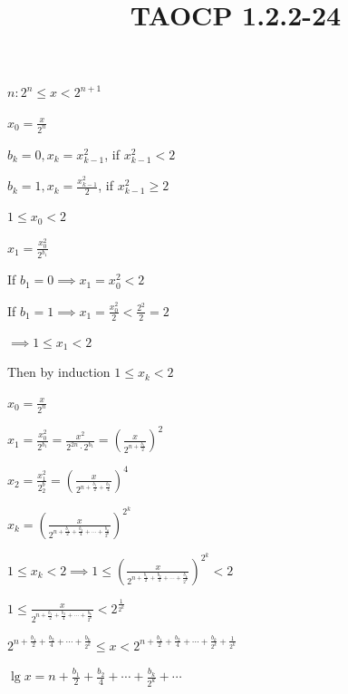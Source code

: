 \documentclass{article}
\title{TAOCP 1.2.2\mbox{-}24}
\begin{document}
\maketitle

\( n: 2^{n} \leq x < 2^{n+1} \)

\( x_{0} = \frac{x}{2^{n}} \)

\( b_{k} = 0, x_{k} = x_{k-1}^{2} \), if \( x_{k-1}^{2} < 2 \)

\( b_{k} = 1, x_{k} = \frac{x_{k-1}^{2}}{2} \), if \( x_{k-1}^{2} \geq 2 \)

\( 1 \leq x_{0} < 2 \)

\( x_{1} = \frac{x_{0}^{2}}{2^{b_{1}}} \)

If \( b_{1}=0 \implies x_{1} = x_{0}^{2} < 2 \)

If \( b_{1}=1 \implies x_{1} = \frac{x_{0}^{2}}{2} < \frac{2^{2}}{2} = 2 \)

\( \implies 1 \leq x_{1} < 2 \)

Then by induction \( 1 \leq x_{k} < 2 \)

\( x_{0} = \frac{x}{2^{n}} \)

\( x_{1} = \frac{x_{0}^{2}}{2^{b_{1}}} = \frac{x^{2}}{2^{2n}\cdot2^{b_{1}}} = {(\frac{x}{2^{n+\frac{b_{1}}{2}}})}^{2} \)

\( x_{2} = \frac{x_{1}^{2}}{2^{b}_{2}} = {(\frac{x}{2^{n+\frac{b_{1}}{2} + \frac{b_{2}}{4}}})}^{4} \)

\( x_{k} = {(\frac{x}{2^{n+\frac{b_{1}}{2} + \frac{b_{2}}{4} + \cdots + \frac{b_{k}}{2^{k}}}})}^{2^{k}} \)

\( 1 \leq x_{k} < 2 \implies 1 \leq {(\frac{x}{2^{n+\frac{b_{1}}{2} + \frac{b_{2}}{4} + \cdots + \frac{b_{k}}{2^{k}}}})}^{2^{k}} < 2 \)

\( 1 \leq \frac{x}{2^{n+\frac{b_{1}}{2} + \frac{b_{2}}{4} + \cdots + \frac{b_{k}}{2^{k}}}} < 2^{\frac{1}{2^{k}}} \)

\( 2^{n+\frac{b_{1}}{2} + \frac{b_{2}}{4} + \cdots + \frac{b_{k}}{2^{k}}} \leq x < 2^{n+\frac{b_{1}}{2} + \frac{b_{2}}{4} + \cdots + \frac{b_{k}}{2^{k}} + \frac{1}{2^{k}}} \)

\( \lg{x} = n+\frac{b_{1}}{2} + \frac{b_{2}}{4} + \cdots + \frac{b_{k}}{2^{k}} + \cdots \)
\end{document}

